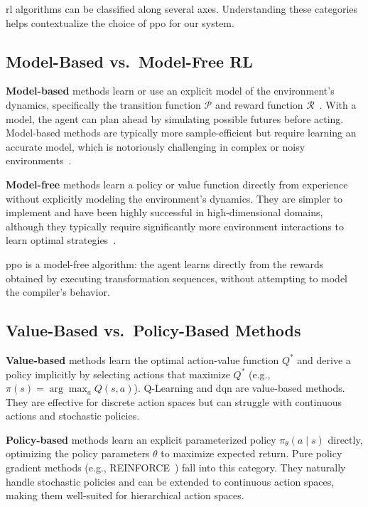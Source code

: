 \gls{rl} algorithms can be classified along several axes. Understanding these categories helps contextualize the choice of \gls{ppo} for our system.

\subsection{Model-Based vs.\ Model-Free RL}

\textbf{Model-based} methods learn or use an explicit model of the environment's dynamics, specifically the transition function $\mathcal{P}$ and reward function $\mathcal{R}$~\cite{sutton2018reinforcement}. With a model, the agent can plan ahead by simulating possible futures before acting. Model-based methods are typically more sample-efficient but require learning an accurate model, which is notoriously challenging in complex or noisy environments~\cite{wang2019benchmarking}.

\textbf{Model-free} methods learn a policy or value function directly from experience without explicitly modeling the environment's dynamics. They are simpler to implement and have been highly successful in high-dimensional domains, although they typically require significantly more environment interactions to learn optimal strategies~\cite{chebotar2017combining, wang2019benchmarking}.

\gls{ppo} is a model-free algorithm: the agent learns directly from the rewards obtained by executing transformation sequences, without attempting to model the compiler's behavior.

\subsection{Value-Based vs.\ Policy-Based Methods}

\textbf{Value-based} methods learn the optimal action-value function $Q^*$ and derive a policy implicitly by selecting actions that maximize $Q^*$ (e.g., $\pi(s) = \arg\max_a Q(s, a)$). Q-Learning and \gls{dqn} are value-based methods. They are effective for discrete action spaces but can struggle with continuous actions and stochastic policies.

\textbf{Policy-based} methods learn an explicit parameterized policy $\pi_\theta(a \mid s)$ directly, optimizing the policy parameters $\theta$ to maximize expected return. Pure policy gradient methods (e.g., REINFORCE~\cite{williams1992simple}) fall into this category. They naturally handle stochastic policies and can be extended to continuous action spaces, making them well-suited for hierarchical action spaces.

